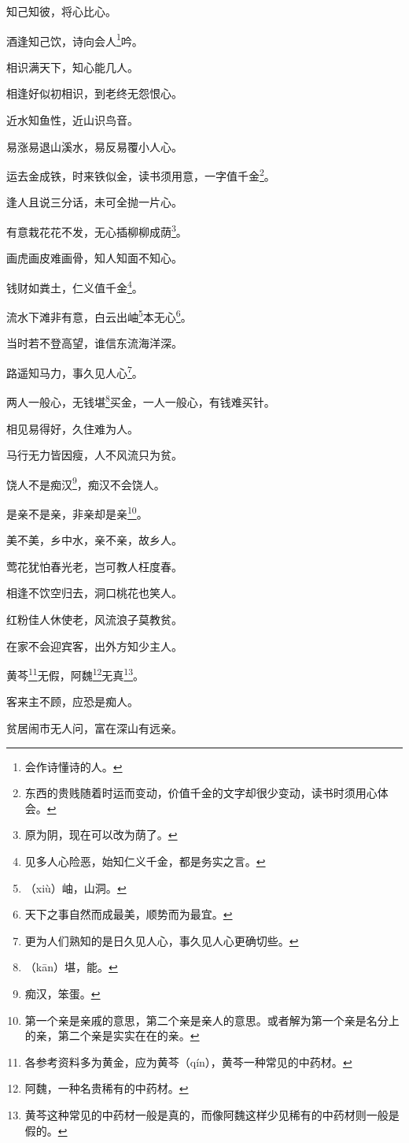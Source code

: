 \documentclass[12pt,oneside]{book}
\begin{document}
知己知彼，将心比心。

酒逢知己饮，诗向会人\footnote{会作诗懂诗的人。}吟。

相识满天下，知心能几人。

相逢好似初相识，到老终无怨恨心。

近水知鱼性，近山识鸟音。

易涨易退山溪水，易反易覆小人心。

运去金成铁，时来铁似金，读书须用意，一字值千金\footnote{东西的贵贱随着时运而变动，价值千金的文字却很少变动，读书时须用心体会。}。

逢人且说三分话，未可全抛一片心。

有意栽花花不发，无心插柳柳成荫\footnote{原为阴，现在可以改为荫了。}。

画虎画皮难画骨，知人知面不知心。

钱财如粪土，仁义值千金\footnote{见多人心险恶，始知仁义千金，都是务实之言。}。

流水下滩非有意，白云出岫\footnote{（xiù）岫，山洞。}本无心\footnote{天下之事自然而成最美，顺势而为最宜。}。

当时若不登高望，谁信东流海洋深。

路遥知马力，事久见人心\footnote{更为人们熟知的是日久见人心，事久见人心更确切些。}。

两人一般心，无钱堪\footnote{（kān）堪，能。}买金，一人一般心，有钱难买针。

相见易得好，久住难为人。

马行无力皆因瘦，人不风流只为贫。

饶人不是痴汉\footnote{痴汉，笨蛋。}，痴汉不会饶人。

是亲不是亲，非亲却是亲\footnote{第一个亲是亲戚的意思，第二个亲是亲人的意思。或者解为第一个亲是名分上的亲，第二个亲是实实在在的亲。}。

美不美，乡中水，亲不亲，故乡人。

莺花犹怕春光老，岂可教人枉度春。

相逢不饮空归去，洞口桃花也笑人。

红粉佳人休使老，风流浪子莫教贫。

在家不会迎宾客，出外方知少主人。

黄芩\footnote{各参考资料多为黄金，应为黄芩（qín），黄芩一种常见的中药材。}无假，阿魏\footnote{阿魏，一种名贵稀有的中药材。}无真\footnote{黄芩这种常见的中药材一般是真的，而像阿魏这样少见稀有的中药材则一般是假的。}。

客来主不顾，应恐是痴人。

贫居闹市无人问，富在深山有远亲。
\end{document}
